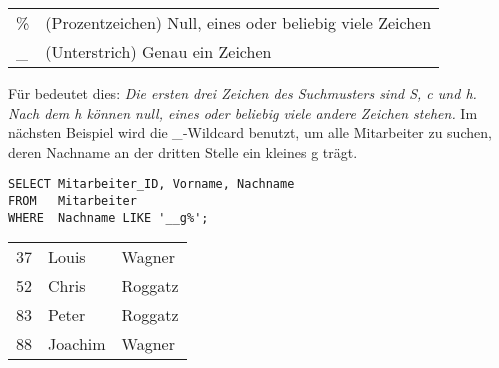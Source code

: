           \begin{center}
            \label{likewildcards}
            \begin{small}
              \tabletail{
                \hline
              }
              \tablelasttail{
                \hline
              }
              \begin{supertabular}{lp{10cm}}
                \% & (Prozentzeichen) Null, eines oder beliebig viele Zeichen \\
                \_ & (Unterstrich) Genau ein Zeichen \\
              \end{supertabular}
            \end{small}
          \end{center}
          Für  bedeutet dies: \textit{Die ersten drei Zeichen des Suchmusters sind S, c und h. Nach dem h können null, eines oder beliebig viele andere Zeichen stehen.} Im nächsten Beispiel wird die \textit{\_}-Wildcard benutzt, um alle Mitarbeiter zu suchen, deren Nachname an der dritten Stelle ein kleines g trägt.
          \begin{lstlisting}[language=oracle_sql,caption={Zeichenkettensuche mit einem etwas komplexeren Suchmuster},label=sql02_09]
SELECT Mitarbeiter_ID, Vorname, Nachname
FROM   Mitarbeiter
WHERE  Nachname LIKE '__g%';
          \end{lstlisting}
\clearpage
          \begin{center}
            \begin{small}
              \tablehead{}
              \begin{msoraclesql}
                \begin{supertabular}{rll}
                37 & Louis & Wagner \\
                52 & Chris & Roggatz \\
                83 & Peter & Roggatz \\
                88 & Joachim & Wagner \\
                \end{supertabular}
              \end{msoraclesql}
            \end{small}
          \end{center}

